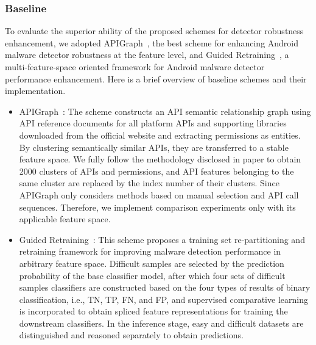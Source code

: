 \subsubsection{Baseline}
To evaluate the superior ability of the proposed schemes for detector robustness enhancement, we adopted APIGraph~\cite{apigraph}, the best scheme for enhancing Android malware detector robustness at the feature level, and Guided Retraining~\cite{guide_retraining}, a multi-feature-space oriented framework for Android malware detector performance enhancement. Here is a brief overview of baseline schemes and their implementation.
\begin{itemize}
    \item APIGraph~\cite{apigraph}: The scheme constructs an API semantic relationship graph using API reference documents for all platform APIs and supporting libraries downloaded from the official website and extracting permissions as entities. By clustering semantically similar APIs, they are transferred to a stable feature space. We fully follow the methodology disclosed in paper to obtain 2000 clusters of APIs and permissions, and API features belonging to the same cluster are replaced by the index number of their clusters. Since APIGraph only considers methods based on manual selection and API call sequences. Therefore, we implement comparison experiments only with its applicable feature space.
    \item Guided Retraining~\cite{guide_retraining}: This scheme proposes a training set re-partitioning and retraining framework for improving malware detection performance in arbitrary feature space. Difficult samples are selected by the prediction probability of the base classifier model, after which four sets of difficult samples classifiers are constructed based on the four types of results of binary classification, i.e., TN, TP, FN, and FP, and supervised comparative learning is incorporated to obtain spliced feature representations for training the downstream classifiers. In the inference stage, easy and difficult datasets are distinguished and reasoned separately to obtain predictions.
\end{itemize}


